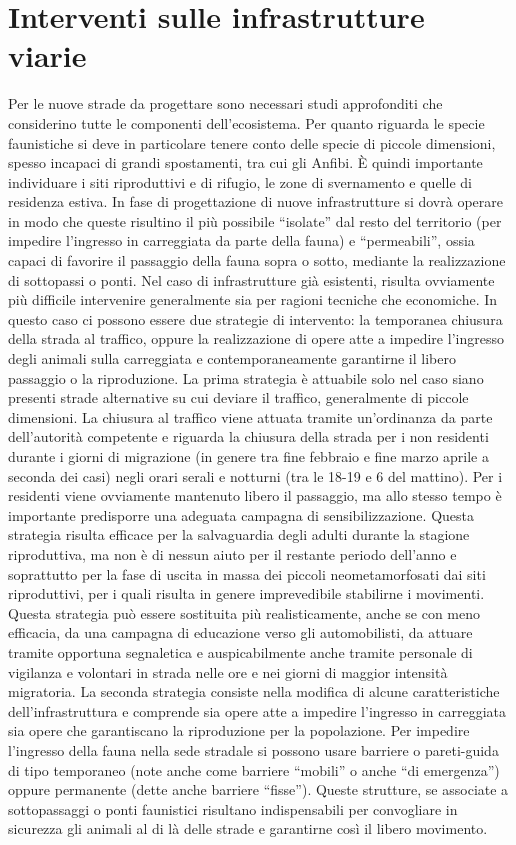 \documentclass[11pt,a4paper,twoside]{memoir}
\begin{document}
\section{Interventi sulle infrastrutture viarie}
\label{sec:actions_infra}
Per le nuove strade da progettare sono necessari studi approfonditi che considerino tutte le componenti dell’ecosistema. Per quanto riguarda le specie faunistiche si deve in particolare tenere conto delle specie di piccole dimensioni, spesso incapaci di grandi spostamenti, tra cui gli Anfibi. È quindi importante individuare i siti riproduttivi e di rifugio, le zone di svernamento e quelle di residenza estiva.
In fase di progettazione di nuove infrastrutture si dovrà operare in modo che queste risultino il più possibile “isolate” dal resto del territorio (per impedire l’ingresso in carreggiata da parte della fauna) e “permeabili”, ossia capaci di favorire il passaggio della fauna sopra o sotto, mediante la realizzazione di sottopassi o ponti.
Nel caso di infrastrutture già esistenti, risulta ovviamente più difficile intervenire generalmente sia per ragioni tecniche che economiche. In questo caso ci possono essere due strategie di intervento: la temporanea chiusura della strada al traffico, oppure la realizzazione di opere atte a impedire l’ingresso degli animali sulla carreggiata e contemporaneamente garantirne il libero passaggio o la riproduzione.
La prima strategia è attuabile solo nel caso siano presenti strade alternative su cui deviare il traffico, generalmente di piccole dimensioni. La chiusura al traffico viene attuata tramite un’ordinanza da parte dell’autorità competente e riguarda la chiusura della strada per i non residenti durante i giorni di migrazione (in genere tra fine febbraio e fine marzo aprile a seconda dei casi) negli orari serali e notturni (tra le 18-19 e 6 del mattino). Per i residenti viene ovviamente mantenuto libero il passaggio, ma allo stesso tempo è importante predisporre una adeguata campagna di sensibilizzazione. Questa strategia risulta efficace per la salvaguardia degli adulti durante la stagione riproduttiva, ma non è di nessun aiuto per il restante periodo dell’anno e soprattutto per la fase di uscita in massa dei piccoli neometamorfosati dai siti riproduttivi, per i quali risulta in genere imprevedibile stabilirne i movimenti.
Questa strategia può essere sostituita più realisticamente, anche se con meno efficacia, da una campagna di educazione verso gli automobilisti, da attuare tramite opportuna segnaletica e auspicabilmente anche tramite personale di vigilanza e volontari in strada nelle ore e nei giorni di maggior intensità migratoria. 
La seconda strategia consiste nella modifica di alcune caratteristiche dell’infrastruttura e comprende sia opere atte a impedire l’ingresso in carreggiata sia opere che garantiscano la riproduzione per la popolazione.
Per impedire l’ingresso della fauna nella sede stradale si possono usare barriere o pareti-guida di tipo temporaneo (note anche come barriere “mobili” o anche “di emergenza”) oppure permanente (dette anche barriere “fisse”). Queste strutture, se associate a sottopassaggi o ponti faunistici risultano indispensabili per convogliare in sicurezza gli animali al di là delle strade e garantirne così il libero movimento.
\end{document}
